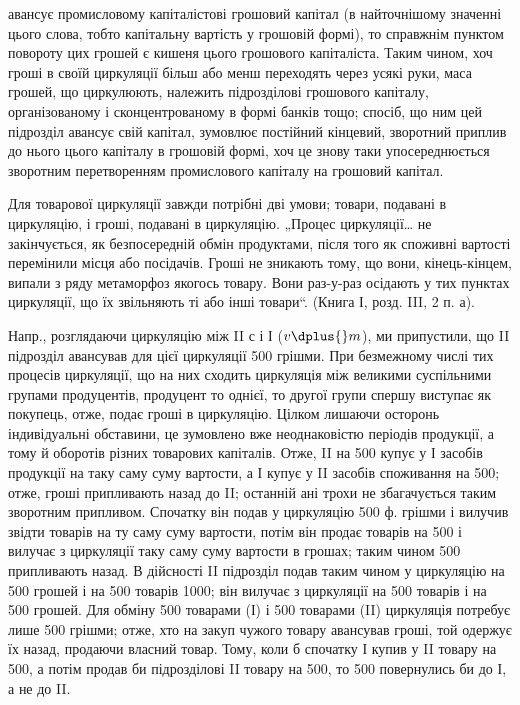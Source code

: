\parcont{}  %
авансує промисловому капіталістові грошовий капітал (в найточнішому
значенні цього слова, тобто капітальну вартість у грошовій формі), то
справжнім пунктом повороту цих грошей є кишеня цього грошового
капіталіста. Таким чином, хоч гроші в своїй циркуляції більш або менш
переходять через усякі руки, маса грошей, що циркулюють, належить
підрозділові грошового капіталу, організованому і сконцентрованому в
формі банків тощо; спосіб, що ним цей підрозділ авансує свій капітал,
зумовлює постійний кінцевий, зворотний приплив до нього цього капіталу
в грошовій формі, хоч це знову таки упосереднюється зворотним перетворенням
промислового капіталу на грошовий капітал.

Для товарової циркуляції завжди потрібні дві умови; товари, подавані
в циркуляцію, і гроші, подавані в циркуляцію. „Процес циркуляції\dots{} не
закінчується, як безпосередній обмін продуктами, після того як споживні
вартості перемінили місця або посідачів. Гроші не зникають тому, що
вони, кінець-кінцем, випали з ряду метаморфоз якогось товару. Вони раз-у-раз
осідають у тих пунктах циркуляції, що їх звільняють ті або інші
товари“. (Книга І, розд. III, 2 п. а).

Напр., розглядаючи циркуляцію між II с і І ($v \dplus{} m$), ми припустили,
що II підрозділ авансував для цієї циркуляції 500 грішми. При
безмежному числі тих процесів циркуляції, що на них сходить циркуляція
між великими суспільними групами продуцентів, продуцент то
однієї, то другої групи спершу виступає як покупець, отже, подає
гроші в циркуляцію. Цілком лишаючи осторонь індивідуальні обставини,
це зумовлено вже неоднаковістю періодів продукції, а тому й оборотів
різних товарових капіталів. Отже, II на 500 купує у І засобів
продукції на таку саму суму вартости, а І купує у II засобів споживання на
500; отже, гроші припливають назад до II; останній ані трохи
не збагачується таким зворотним припливом. Спочатку він подав у циркуляцію
500 ф. грішми і вилучив звідти товарів на ту саму суму вартости,
потім він продає товарів на 500 і вилучає з циркуляції
таку саму суму вартости в грошах; таким чином 500 припливають
назад. В дійсності II підрозділ подав таким чином у циркуляцію
на 500 грошей і на 500 товарів \deq{} 1000;
він вилучає з циркуляції на 500 товарів і на 500
грошей. Для обміну 500 товарами (І) і 500 товарами
(II) циркуляція потребує лише 500 грішми; отже,
хто на закуп чужого товару авансував гроші, той одержує їх
назад, продаючи власний товар. Тому, коли б спочатку І купив у II
товару на 500, а потім продав би підрозділові II товару на
500, то 500 повернулись би до І, а не до II.

